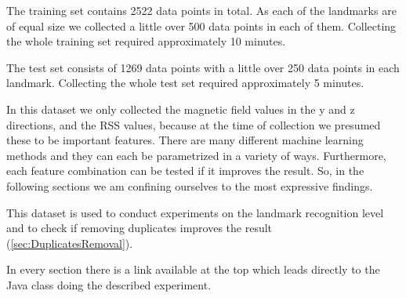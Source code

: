 The training set contains 2522 data points in total. As each of the landmarks are of equal size we collected a little over 500 data points in each of them. Collecting the whole training set required approximately 10 minutes.

The test set consists of 1269 data points with a little over 250 data points in each landmark. Collecting the whole test set required approximately 5 minutes.

In this dataset we only collected the magnetic field values in the y and z directions, and the RSS values, because at the time of collection we presumed these to be important features. There are many different machine learning methods and they can each be parametrized in a variety of ways. Furthermore, each feature combination can be tested if it improves the result. So, in the following sections we am confining ourselves to the most expressive findings.

This dataset is used to conduct experiments on the landmark recognition level and to check if removing duplicates improves the result (\ref{sec:DuplicatesRemoval}).


In every section there is a link available at the top which leads directly to the Java class doing the described experiment.

